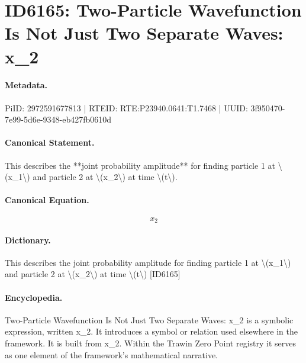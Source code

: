 \section*{ID6165: Two-Particle Wavefunction Is Not Just Two Separate Waves: x\_2}
\paragraph{Metadata.}
PiID: 2972591677813 | RTEID: RTE:P23940.0641:T1.7468 | UUID: 3f950470-7e99-5d6e-9348-eb427fb0610d

\paragraph{Canonical Statement.}
This describes the **joint probability amplitude** for finding particle 1 at \textbackslash{}(x\_1\textbackslash{}) and particle 2 at \textbackslash{}(x\_2\textbackslash{}) at time \textbackslash{}(t\textbackslash{}).

\paragraph{Canonical Equation.}
\[
x_2
\]

\paragraph{Dictionary.}
This describes the joint probability amplitude for finding particle 1 at \textbackslash{}(x\_1\textbackslash{}) and particle 2 at \textbackslash{}(x\_2\textbackslash{}) at time \textbackslash{}(t\textbackslash{}) [ID6165]

\paragraph{Encyclopedia.}
Two-Particle Wavefunction Is Not Just Two Separate Waves: x\_2 is a symbolic expression, written x\_2. It introduces a symbol or relation used elsewhere in the framework. It is built from x\_2. Within the Trawin Zero Point registry it serves as one element of the framework's mathematical narrative.
